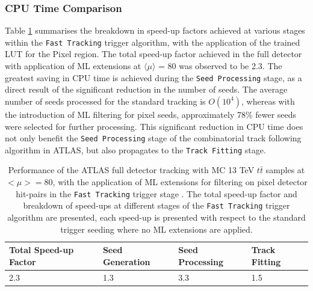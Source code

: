 \subsubsection{CPU Time Comparison}


Table \ref{tab:cpu} summarises the breakdown in speed-up factors achieved at various stages within the \texttt{Fast Tracking} trigger algorithm, with the application of the trained LUT for the Pixel region. The total speed-up factor achieved in the full detector with application of ML extensions at $\langle \mu \rangle$ = 80 was observed to be 2.3. The greatest saving in CPU time is achieved during the \texttt{Seed Processing} stage, as a direct result of the significant reduction in the number of seeds. The average number of seeds processed for the standard tracking is $O(10^{4})$, whereas with the introduction of ML filtering for pixel seeds, approximately 78\% fewer seeds were selected for further processing. This significant reduction in CPU time does not only benefit the \texttt{Seed Processing} stage of the combinatorial track following algorithm in ATLAS, but also propagates to the \texttt{Track Fitting} stage.

\begin{table}[!htbp]
\caption{Performance of the ATLAS full detector tracking with MC 13 TeV $t\bar{t}$ samples at $<\mu> = 80$, with the application of ML extensions for filtering on pixel detector hit-pairs in the \texttt{Fast Tracking} trigger stage \cite{public-hlt}. The total speed-up factor and breakdown of speed-ups at different stages of the \texttt{Fast Tracking} trigger algorithm are presented, each speed-up is presented with respect to the standard trigger seeding where no ML extensions are applied.}
\begin{center}
\begin{tabular}{llll}
\toprule
Total Speed-up Factor & Seed Generation & Seed Processing & Track Fitting \\
\hline
2.3 & 1.3 & 3.3 & 1.5 \\ 
\bottomrule
\end{tabular}
\end{center}
\label{tab:cpu}
\end{table}

